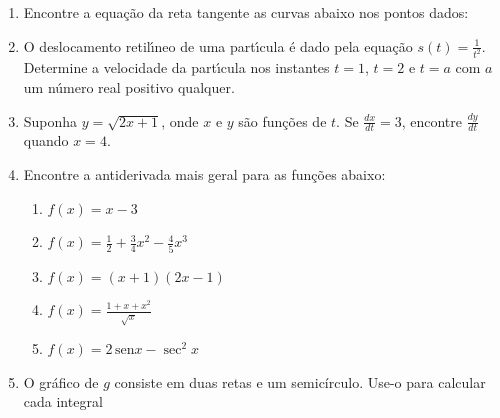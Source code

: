 \documentclass[a4paper,5pt]{amsbook}
\newcommand{\sen}{\,\mbox{sen}}
\newcommand{\ds}{\displaystyle}
\begin{document}
\begin{enumerate}
    \vspace{0.5cm}
    \item Encontre a equa\c{c}\~ao da reta tangente as curvas abaixo nos pontos
        dados:

        \noindent{}

    \vspace{0.5cm}
    \item O deslocamento retil\'{\i}neo de uma part\'{\i}cula \'e dado pela equa\c{c}\~ao
        $s(t)=\ds\frac{1}{t^2}$. Determine a velocidade da part\'{\i}cula nos
        instantes $t=1$, $t=2$ e $t=a$ com $a$ um n\'umero real positivo
        qualquer.

    \vspace{0.5cm}
    \item Suponha $y=\sqrt{2x+1}$, onde $x$ e $y$ s\~ao fun\c{c}\~oes de $t$.  Se
        $\ds\frac{dx}{dt}=3$, encontre $\ds\frac{dy}{dt}$ quando $x=4$.

    \vspace{0.5cm}
    \item Encontre a antiderivada mais geral para as fun\c{c}\~oes abaixo:
        \begin{enumerate}
            \item $f(x)=x-3$
            \item $f(x)=\ds\frac{1}{2}+\frac{3}{4}x^2-\frac{4}{5}x^3$
            \item $f(x)=(x+1)(2x-1)$
            \item $f(x)=\ds\frac{1+x+x^2}{\sqrt{x}}$
            \item $f(x)=2\sen{x}-\sec^2{x}$
        \end{enumerate}

    \vspace{0.5cm}
    \item O gr\'afico de $g$ consiste em duas retas e um semic\'{i}rculo. Use-o
        para calcular cada integral

    

\end{enumerate}
\end{document}
